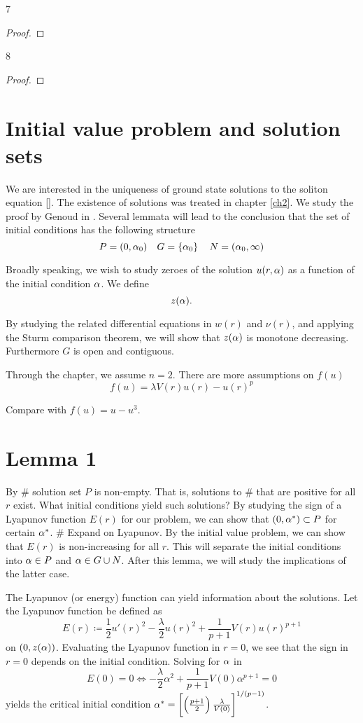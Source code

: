 \begin{lemma}
7
\end{lemma}
\begin{proof}
\end{proof}

\begin{lemma}
8
\end{lemma}
\begin{proof}
\end{proof}

\section{Initial value problem and solution sets}
We are interested in the uniqueness of ground state solutions to the soliton
equation \eqref{}. The existence of solutions was treated in chapter \ref{ch2}.
We study the proof by Genoud in \cite{gen11}. Several lemmata will lead to the
conclusion that the set of initial conditions has the following structure
\[ P=(0,\alpha_0)\quad G=\left\{\alpha_0\right\}\quad N=(\alpha_0,\infty) \]

Broadly speaking, we wish to study zeroes of the solution $u(r,\alpha)$ as a
function of the initial condition $\alpha$. {\red We define}
\[ z(\alpha). \]

By studying the related differential equations in $w(r)$ and $\nu(r)$, and
applying the Sturm comparison theorem, we will show that $z(\alpha)$ is
monotone decreasing. Furthermore {\red $G$ is open and contiguous}.

Through the chapter, we assume $n=2$. There are more assumptions on $f(u)$
\[ f(u) = \lambda V(r)u(r) - u(r)^p \]

{\red Compare with $f(u)=u-u^3$}.

\section{Lemma 1}
By \# solution set $P$ is non-empty. That is, solutions to \# that are positive for all $r$ exist. What initial conditions yield such solutions? By studying the sign of a Lyapunov function $E(r)$ for our problem, we can show that $(0,\alpha^*)\subset P$ for certain $\alpha^*$. \# Expand on Lyapunov. By the initial value problem, we can show that $E(r)$ is non-increasing for all $r$. This will separate the initial conditions into $\alpha\in P$ and $\alpha\in G\cup N$. After this lemma, we will study the implications of the latter case.

The Lyapunov (or energy) function can yield information about the solutions. Let the Lyapunov function be defined as $$E(r)\coloneqq\frac{1}{2}u'(r)^2-\frac{\lambda}{2}u(r)^2+\frac{1}{p+1}V(r)u(r)^{p+1}$$ on $(0,z(\alpha))$. Evaluating the Lyapunov function in $r=0$, we see that the sign in $r=0$ depends on the initial condition. Solving for $\alpha$ in $$E(0)=0\iff-\frac{\lambda}{2}\alpha^2+\frac{1}{p+1}V(0)\alpha^{p+1}=0$$ yields the critical initial condition $\alpha^*=\left[\left(\frac{p+1}{2}\right)\frac{\lambda}{V(0)} \right]^{1/(p-1)}$. 

